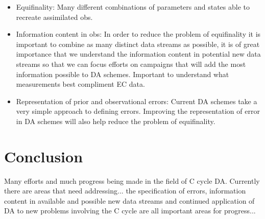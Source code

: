 \documentclass[12pt]{article}
\begin{document}
\begin{itemize}
\item Equifinality: Many different combinations of parameters and states able to recreate assimilated obs.

\item Information content in obs: In order to reduce the problem of equifinality it is important to combine as many distinct data streams as possible, it is of great importance that we understand the information content in potential new data streams so that we can focus efforts on campaigns that will add the most information possible to DA schemes. Important to understand what measurements best compliment EC data.

\item Representation of prior and observational errors: Current DA schemes take a very simple approach to defining errors. Improving the representation of error in DA schemes will also help reduce the problem of equifinality.  
\end{itemize}

\section{Conclusion} 

Many efforts and much progress being made in the field of C cycle DA. Currently there are areas that need addressing... the specification of errors, information content in available and possible new data streams and continued application of DA to new problems involving the C cycle are all important areas for progress...







{}
\end{document}
